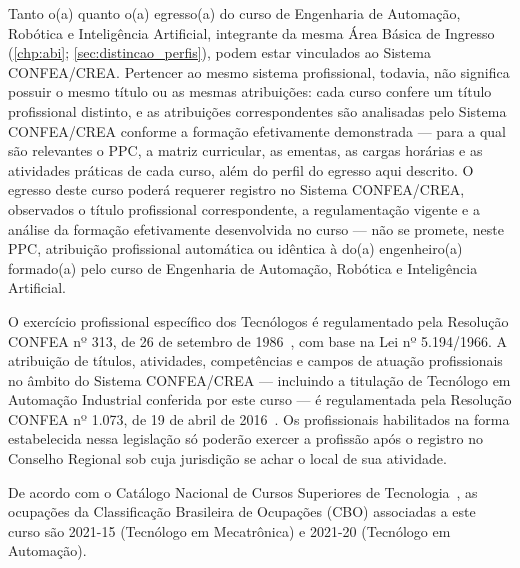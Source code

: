 Tanto o(a) \ppctitulacao quanto o(a) egresso(a) do curso de Engenharia de Automação, Robótica e Inteligência Artificial, integrante da mesma Área Básica de Ingresso (\autoref{chp:abi}; \autoref{sec:distincao_perfis}), podem estar vinculados ao Sistema CONFEA/CREA. Pertencer ao mesmo sistema profissional, todavia, não significa possuir o mesmo título ou as mesmas atribuições: cada curso confere um título profissional distinto, e as atribuições correspondentes são analisadas pelo Sistema CONFEA/CREA conforme a formação efetivamente demonstrada — para a qual são relevantes o PPC, a matriz curricular, as ementas, as cargas horárias e as atividades práticas de cada curso, além do perfil do egresso aqui descrito. O egresso deste curso poderá requerer registro no Sistema CONFEA/CREA, observados o título profissional correspondente, a regulamentação vigente e a análise da formação efetivamente desenvolvida no curso — não se promete, neste PPC, atribuição profissional automática ou idêntica à do(a) engenheiro(a) formado(a) pelo curso de Engenharia de Automação, Robótica e Inteligência Artificial.

O exercício profissional específico dos Tecnólogos é regulamentado pela Resolução CONFEA nº 313, de 26 de setembro de 1986~\cite{confea_313_1986}, com base na Lei nº 5.194/1966. A atribuição de títulos, atividades, competências e campos de atuação profissionais no âmbito do Sistema CONFEA/CREA — incluindo a titulação de Tecnólogo em Automação Industrial conferida por este curso — é regulamentada pela Resolução CONFEA nº 1.073, de 19 de abril de 2016~\cite{confea_1073_2016}. Os profissionais habilitados na forma estabelecida nessa legislação só poderão exercer a profissão após o registro no Conselho Regional sob cuja jurisdição se achar o local de sua atividade.

De acordo com o Catálogo Nacional de Cursos Superiores de Tecnologia~\cite{mec_cncst_2024}, as ocupações da Classificação Brasileira de Ocupações (CBO) associadas a este curso são 2021-15 (Tecnólogo em Mecatrônica) e 2021-20 (Tecnólogo em Automação).
